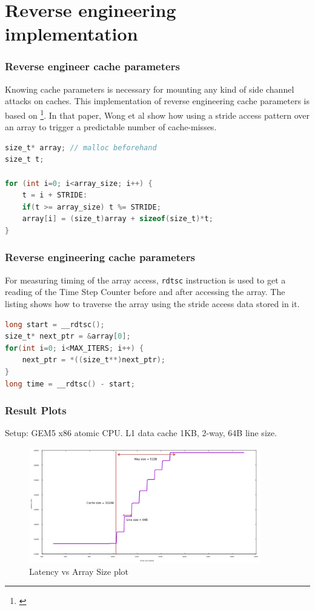 \documentclass[10pt]{beamer}
\begin{document}
\section{Reverse engineering implementation}
\begin{frame}[fragile]
\frametitle{Reverse engineer cache parameters}
    Knowing cache parameters is necessary for mounting any kind of side channel attacks on caches.
    This implementation of reverse engineering cache parameters is based on \footnote{\cite{wong}}. In that
    paper, Wong et al show how using a stride access pattern over an array to trigger a predictable number of cache-misses.

\begin{lstlisting}[caption={Generate array of given size with fixed stride pattern},language={C}]
size_t* array; // malloc beforehand
size_t t;

for (int i=0; i<array_size; i++) {
    t = i + STRIDE:
    if(t >= array_size) t %= STRIDE;
    array[i] = (size_t)array + sizeof(size_t)*t;
}
\end{lstlisting}

\end{frame}


\begin{frame}[fragile]
\frametitle{Reverse engineering cache parameters}
For measuring timing of the array access, \texttt{rdtsc} instruction is used to get a reading of the Time Step Counter before
and after accessing the array. The listing shows how to traverse the array
using the stride access data stored in it.
\begin{lstlisting}[caption={Timing measurement of stride access over the entire array},language={C}]
long start = __rdtsc();
size_t* next_ptr = &array[0];
for(int i=0; i<MAX_ITERS; i++) {
    next_ptr = *((size_t**)next_ptr);
}
long time = __rdtsc() - start;
\end{lstlisting}
\end{frame}

\begin{frame}
\frametitle{Result Plots}
Setup: GEM5 x86 atomic CPU. L1 data cache 1KB, 2-way, 64B line size.
\begin{figure}
\includegraphics[width=0.9\textwidth]{figures/reverse_eng_1kb}
\caption{Latency vs Array Size plot}
\end{figure}
\end{frame}
\end{document}
